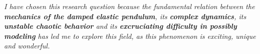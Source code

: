 \textit{I have chosen this research question because the fundamental relation between the \textbf{mechanics of the damped elastic pendulum}, its \textbf{complex dynamics}, its \textbf{unstable chaotic behavior} and its \textbf{excruciating difficulty in possibly modeling} has led me to explore this field, as this phenomenon is exciting, unique and wonderful.}

